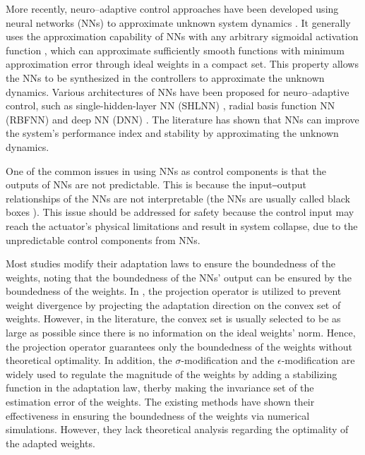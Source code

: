 \documentclass[letterpaper, 10 pt, conference]{ieeeconf}  %
\begin{document}
More recently, neuro–adaptive control approaches have been developed using neural networks (NNs) to approximate unknown system dynamics \cite{Farrell:2006aa}.
It generally uses the approximation capability of NNs with any arbitrary sigmoidal activation function \cite{Cybenko:1989aa}, which can approximate sufficiently smooth functions with minimum approximation error through ideal weights in a compact set.
This property allows the NNs to be synthesized in the controllers to approximate the unknown dynamics.
Various architectures of NNs have been proposed for neuro–adaptive control, such as single-hidden-layer NN (SHLNN) \cite{Esfandiari:2015aa,Gao:2006aa}, radial basis function NN (RBFNN) \cite{Ge:2002aa,Zhou:2023aa} and deep NN (DNN) \cite{Patil:2022aa}.
The literature has shown that NNs can improve the system's performance index and stability by approximating the unknown dynamics.


One of the common issues in using NNs as control components is that the outputs of NNs are not predictable.
This is because the input‒output relationships of the NNs are not interpretable (\ie the NNs are usually called black boxes \cite{Sheu:2020aa,Rudin:2019aa}).
This issue should be addressed for safety because the control input may reach the actuator's physical limitations and result in system collapse, due to the unpredictable control components from NNs.

Most studies modify their adaptation laws to ensure the boundedness of the weights, noting that the boundedness of the NNs' output can be ensured by the boundedness of the weights.
In \cite{Zhou:2023aa,Patil:2022aa}, the projection operator is utilized to prevent weight divergence by projecting the adaptation direction on the convex set of weights.
However, in the literature, the convex set is usually selected to be as large as possible since there is no information on the ideal weights' norm.
Hence, the projection operator guarantees only the boundedness of the weights without theoretical optimality.
In addition, the $\sigma$-modification\cite{Ge:2002aa} and the $\epsilon$-modification \cite{Esfandiari:2015aa,Gao:2006aa} are widely used to regulate the magnitude of the weights by adding a stabilizing function in the adaptation law, therby making the invariance set of the estimation error of the weights. 
The existing methods have shown their effectiveness in ensuring the boundedness of the weights via numerical simulations.
However, they lack theoretical analysis regarding the optimality of the adapted weights.
\end{document}
